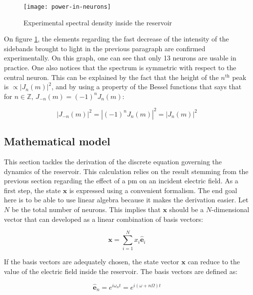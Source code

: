 \begin{figure}[h]
	\centering
	\texttt{[image: power-in-neurons]}
	\caption{Experimental spectral density inside the reservoir \cite{AkroutAkram2016Pprc}}
	\label{power-in-neurons}
\end{figure}

On figure \ref{power-in-neurons}, the elements regarding the fast decrease of the intensity of the sidebands brought to light in the previous paragraph are confirmed experimentally. On this graph, one can see that only 13 neurons are usable in practice. One also notices that the spectrum is symmetric with respect to the central neuron. This can be explained by the fact that the height of the $n^{\text{th}}$ peak is $\propto |J_n(m)|^2$, and by using a property of the Bessel functions that says that for $n \in \mathbb{Z}$, $J_{-n}(m)=(-1)^n J_n(m)$:

\begin{equation}
	|J_{-n}(m)|^2 = |(-1)^n J_n(m)|^2 = |J_n(m)|^2
\end{equation}


\subsection{Mathematical model}

This section tackles the derivation of the discrete equation governing the dynamics of the reservoir. This calculation relies on the result stemming from the previous section regarding the effect of a \gls{pm} on an incident electric field. As a first step, the state $\mathbf{x}$ is expressed using a convenient formalism. The end goal here is to be able to use linear algebra because it makes the derivation easier. Let $N$ be the total number of neurons. This implies that $\mathbf{x}$ should be a $N$-dimensional vector that can developed as a linear combination of basis vectors:

\begin{equation}
	\mathbf{x} = \sum_{i=1}^{N} x_i \hat{\mathbf{e}}_i
\end{equation}

If the basis vectors are adequately chosen, the state vector $\mathbf{x}$ can reduce to the value of the electric field inside the reservoir. The basis vectors are defined as:

\begin{equation}
	\hat{\mathbf{e}}_n = e^{i\omega_nt} = e^{i(\omega+n\Omega)t}
\end{equation}

